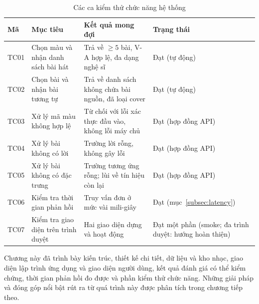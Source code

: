 \documentclass[../DoAn.tex]{subfiles}
\begin{document}
\begin{table}[h!]
\centering
\caption{Các ca kiểm thử chức năng hệ thống}
\label{table:testcase}
\begin{tabular}{p{1.0cm} p{4.4cm} p{5.2cm} p{2.6cm}}
\toprule
\textbf{Mã} & \textbf{Mục tiêu} & \textbf{Kết quả mong đợi} & \textbf{Trạng thái} \\
\midrule
TC01 & Chọn màu và nhận danh sách bài hát & Trả về $\geq 5$ bài, V-A hợp lệ, đa dạng nghệ sĩ & Đạt (tự động) \\
TC02 & Chọn bài và nhận bài tương tự & Trả về danh sách không chứa bài nguồn, đã loại cover & Đạt (tự động) \\
TC03 & Xử lý mã màu không hợp lệ & Từ chối với lỗi xác thực đầu vào, không lỗi máy chủ & Đạt (hợp đồng API) \\
TC04 & Xử lý bài không có lời & Trường lời rỗng, không gây lỗi & Đạt (hợp đồng API) \\
TC05 & Xử lý bài không có đặc trưng & Trường tương ứng rỗng; lùi về tín hiệu còn lại & Đạt (hợp đồng API) \\
TC06 & Kiểm tra thời gian phản hồi & Truy vấn đơn ở mức vài mili-giây & Đạt (mục~\ref{subsec:latency}) \\
TC07 & Kiểm tra giao diện trên trình duyệt & Hai giao diện dựng và hoạt động & Đạt một phần (smoke; đa trình duyệt: hướng hoàn thiện) \\
\bottomrule
\end{tabular}
\end{table}

Chương này đã trình bày kiến trúc, thiết kế chi tiết, dữ liệu và kho nhạc, giao diện lập trình ứng dụng và giao diện người dùng, kết quả đánh giá có thể kiểm chứng, thời gian phản hồi đo được và phần kiểm thử chức năng. Những giải pháp và đóng góp nổi bật rút ra từ quá trình này được phân tích trong chương tiếp theo.
\end{document}
